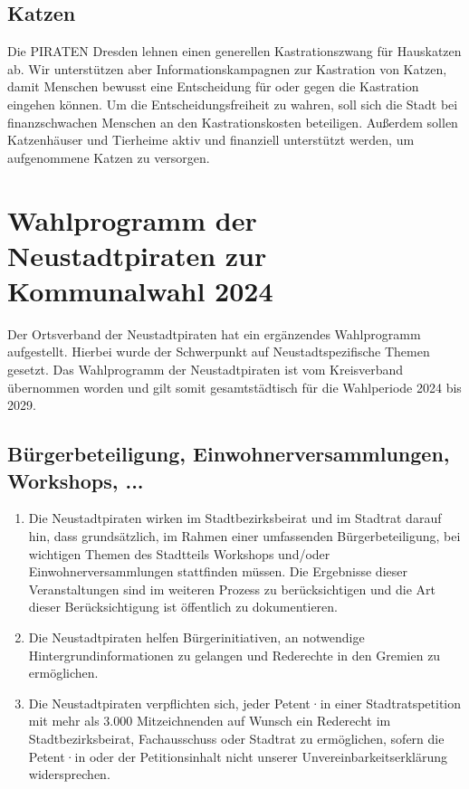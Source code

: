 \documentclass[a4paper, 11pt]{article}
\begin{document}
\subsection{Katzen}
Die PIRATEN Dresden lehnen einen generellen Kastrationszwang für Hauskatzen ab. Wir unterstützen aber Informationskampagnen zur Kastration von Katzen, damit Menschen bewusst eine Entscheidung für oder gegen die Kastration eingehen können. Um die Entscheidungsfreiheit zu wahren, soll sich die Stadt bei finanzschwachen Menschen an den Kastrationskosten beteiligen. Außerdem sollen Katzenhäuser und Tierheime aktiv und finanziell unterstützt werden, um aufgenommene Katzen zu versorgen.

\section{Wahlprogramm der Neustadtpiraten zur Kommunalwahl 2024}

Der Ortsverband der Neustadtpiraten hat ein ergänzendes Wahlprogramm aufgestellt. Hierbei wurde der Schwerpunkt auf Neustadtspezifische Themen gesetzt. Das Wahlprogramm der Neustadtpiraten ist vom Kreisverband übernommen worden und gilt somit gesamtstädtisch für die Wahlperiode 2024 bis 2029.




\subsection{Bürgerbeteiligung, Einwohnerversammlungen, Workshops, ... }

\begin{enumerate}

\item Die Neustadtpiraten wirken im Stadtbezirksbeirat und im Stadtrat darauf hin, dass grundsätzlich, im Rahmen einer umfassenden Bürgerbeteiligung, bei wichtigen Themen des Stadtteils Workshops und/oder Einwohnerversammlungen stattfinden müssen. Die Ergebnisse dieser Veranstaltungen sind im weiteren Prozess zu berücksichtigen und die Art dieser Berücksichtigung ist öffentlich zu dokumentieren.

\item Die Neustadtpiraten helfen Bürgerinitiativen, an notwendige Hintergrundinformationen zu gelangen und Rederechte in den Gremien zu ermöglichen.

\item Die Neustadtpiraten verpflichten sich, jeder Petent·in einer Stadtratspetition mit mehr als 3.000 Mitzeichnenden auf Wunsch ein Rederecht im Stadtbezirksbeirat, Fachausschuss oder Stadtrat zu ermöglichen, sofern die Petent·in oder der Petitionsinhalt nicht unserer Unvereinbarkeitserklärung widersprechen.

\end{enumerate}
\end{document}
